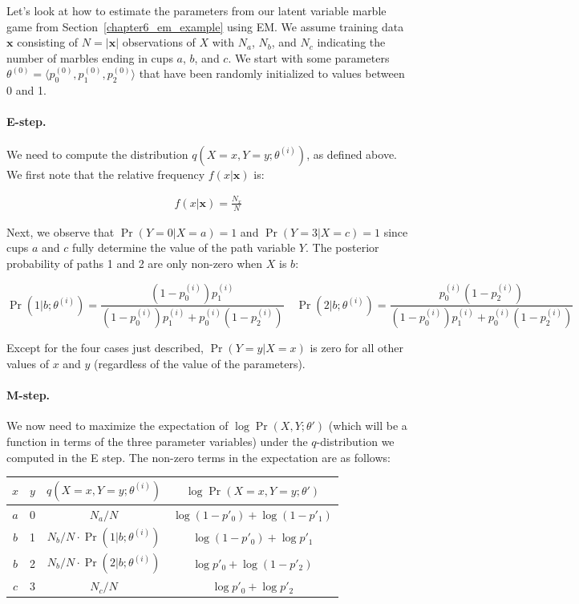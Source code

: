 Let's look at how to estimate the parameters from our latent variable
marble game from Section~\ref{chapter6_em_example} using EM.  We
assume training data $\textbf{x}$ consisting of $N=|\textbf{x}|$
observations of $X$ with $N_a$, $N_b$, and $N_c$ indicating the number
of marbles ending in cups $a$, $b$, and $c$.  We start with some
parameters $\theta^{(0)}=\langle p_0^{(0)}, p_1^{(0)}, p_2^{(0)}
\rangle$ that have been randomly initialized to values between 0 and
1.

\paragraph{\textbf{E-step.}}
We need to compute the distribution $q(X=x,Y=y;\theta^{(i)})$, as
defined above.  We first note that the relative frequency
$f(x|\textbf{x})$ is:

\begin{eqnarray*}
f(x|\textbf{x}) = \frac{N_x}{N}
\end{eqnarray*}

\noindent Next, we observe that $\Pr(Y=0|X=a)=1$ and $\Pr(Y=3|X=c)=1$
since cups $a$ and $c$ fully determine the value of the path variable
$Y$.  The posterior probability of paths 1 and 2 are only non-zero
when $X$ is $b$:

\begin{equation}
\Pr(1|b;\theta^{(i)}) = \frac{(1-p_0^{(i)}) p_1^{(i)}}{(1-p_0^{(i)}) p_1^{(i)} + p_0^{(i)} (1-p_2^{(i)})} \quad \Pr(2|b;\theta^{(i)}) = \frac{p_0^{(i)} (1-p_2^{(i)})}{(1-p_0^{(i)}) p_1^{(i)} + p_0^{(i)} (1-p_2^{(i)})}
\end{equation}

\noindent Except for the four cases just described, $\Pr(Y=y|X=x)$ is
zero for all other values of $x$ and $y$ (regardless of the value of
the parameters).

\paragraph{\textbf{M-step.}}
We now need to maximize the expectation of $\log \Pr(X,Y;\theta')$
(which will be a function in terms of the three parameter variables)
under the $q$-distribution we computed in the E step.  The non-zero
terms in the expectation are as follows:

\begin{center}
\begin{tabular}{c|c|c|c}
$x$ & $y$ & $q(X=x,Y=y;\theta^{(i)})$ & $\log \Pr(X=x,Y=y;\theta')$ \\
\hline
$a$ & 0 & $N_a/N$ & $\log (1-p'_0) + \log (1 - p'_1)$ \\
$b$ & 1 & $N_b/N \cdot \Pr(1|b;\theta^{(i)}) $ & $\log(1 - p'_0) + \log p'_1$ \\
$b$ & 2 & $N_b/N \cdot \Pr(2|b;\theta^{(i)}) $ & $\log p'_0 + \log (1-p'_2)$ \\
$c$ & 3 & $N_c/N$ & $\log p'_0 + \log p'_2$ \\
\end{tabular}
\end{center}

